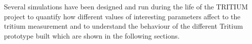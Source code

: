 Several simulations have been designed and run during the life of the TRITIUM project to quantify how different values of interesting parameters affect to the tritium measurement and to understand the behaviour of the different Tritium prototype built which are shown in the following sections. 